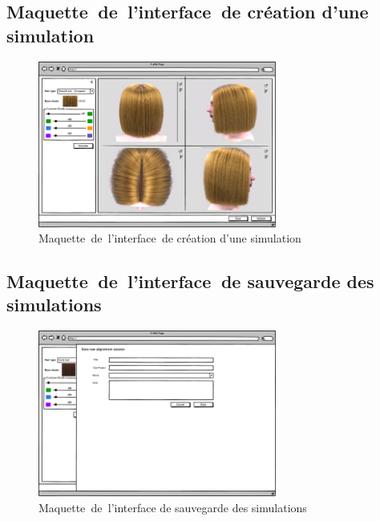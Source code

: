 \subsection{Maquette\textcolor{white}{J}de\textcolor{white}{J}l’interface\textcolor{white}{J}de création d’une simulation}
\begin{figure}[!ht]\centering
\includegraphics[width=0.7\textwidth,angle=00]{chapitres/chapitre5/figures/Maq-1.png}
\caption{Maquette\textcolor{white}{J}de\textcolor{white}{J}l’interface\textcolor{white}{J}de création d’une simulation}
\label{fig:OffreSeq}
\end{figure}

\subsection{Maquette\textcolor{white}{J}de\textcolor{white}{J}l’interface\textcolor{white}{J}de sauvegarde des simulations}
\begin{figure}[!ht]\centering
\includegraphics[width=0.7\textwidth,angle=00]{chapitres/chapitre5/figures/Maq-2.png}
\caption{Maquette\textcolor{white}{J}de\textcolor{white}{J}l’interface de sauvegarde des simulations}
\label{fig:OffreSeq}
\end{figure}

\newpage

